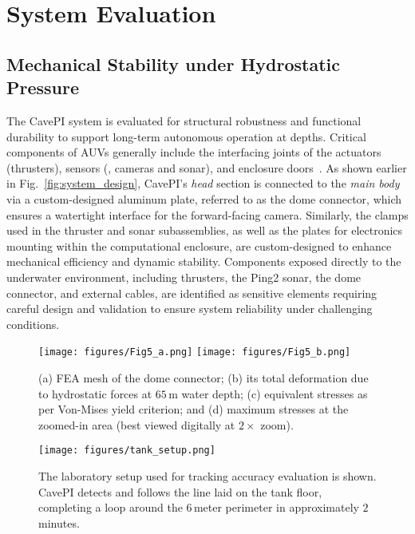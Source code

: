 \section{System Evaluation}



 
\subsection{Mechanical Stability under Hydrostatic Pressure}
\label{sub:Stability}
The CavePI system is evaluated for structural robustness and functional durability to support long-term autonomous operation at depths. Critical components of AUVs generally include the interfacing joints of the actuators (thrusters), sensors (\eg, cameras and sonar), and enclosure doors~\cite{macias2024numerical}. As shown earlier in Fig.~\ref{fig:system_design}, CavePI’s \textit{head} section is connected to the \textit{main body} via a custom-designed aluminum plate, referred to as the dome connector, which ensures a watertight interface for the forward-facing camera. Similarly, the clamps used in the thruster and sonar subassemblies, as well as the plates for electronics mounting within the computational enclosure, are custom-designed to enhance mechanical efficiency and dynamic stability. Components exposed directly to the underwater environment, including thrusters, the Ping2 sonar, the dome connector, and external cables, are identified as sensitive elements requiring careful design and validation to ensure system reliability under challenging conditions.

\begin{figure}[t]
     \centering
     \texttt{[image: figures/Fig5\_a.png]}
     \texttt{[image: figures/Fig5\_b.png]}%
     \caption{(a) FEA mesh of the dome connector; (b) its total deformation due to hydrostatic forces at $65$\,m water depth; (c) equivalent stresses as per Von-Mises yield criterion; and (d) maximum stresses at the zoomed-in area (best viewed digitally at $2\times$ zoom).}%
     \vspace{-2mm}
     \label{fig:dome_connector_stress}
 \end{figure}


\begin{figure*}[t]
     \centering
     \texttt{[image: figures/tank\_setup.png]}%
     \vspace{-1.5mm}
     \caption{The laboratory setup used for tracking accuracy evaluation is shown. CavePI detects and follows the line laid on the tank floor, completing a loop around the $6$\,meter perimeter in approximately $2$\,minutes.}%
     \vspace{-2mm}
     \label{fig:tank_setup}
 \end{figure*}

